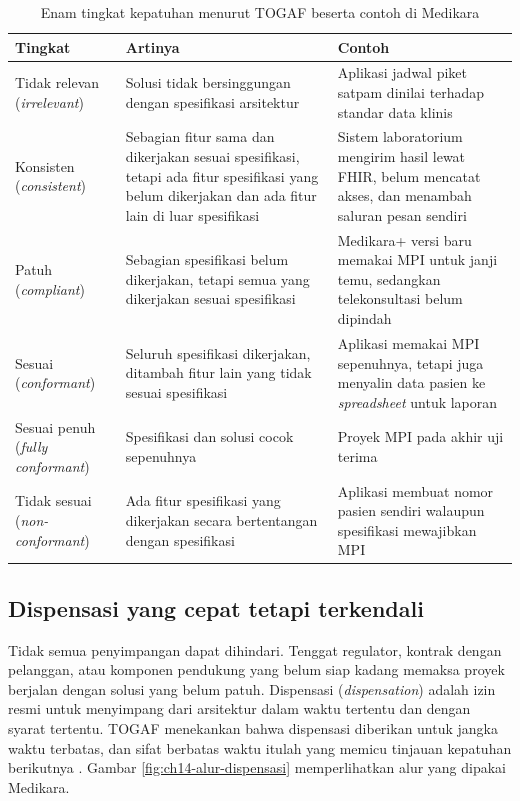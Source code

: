 \begin{table}[!htb]
  \centering
  \caption{Enam tingkat kepatuhan menurut TOGAF beserta contoh di Medikara}
  \label{tab:ch14-tingkat-kepatuhan}
  \begin{tabularx}{\textwidth}{>{\raggedright\arraybackslash}p{2.2cm}>{\raggedright\arraybackslash}X>{\raggedright\arraybackslash}X}
    \hline
    \textbf{Tingkat} & \textbf{Artinya} & \textbf{Contoh} \\
    \hline
    Tidak relevan (\textit{irrelevant}) & Solusi tidak bersinggungan dengan
      spesifikasi arsitektur & Aplikasi jadwal piket satpam dinilai
      terhadap standar data klinis \\
    \hline
    Konsisten (\textit{consistent}) & Sebagian fitur sama dan dikerjakan
      sesuai spesifikasi, tetapi ada fitur spesifikasi yang belum dikerjakan
      dan ada fitur lain di luar spesifikasi & Sistem laboratorium mengirim
      hasil lewat FHIR, belum mencatat akses, dan menambah saluran pesan
      sendiri \\
    \hline
    Patuh (\textit{compliant}) & Sebagian spesifikasi belum dikerjakan,
      tetapi semua yang dikerjakan sesuai spesifikasi & Medikara+ versi baru
      memakai MPI untuk janji temu, sedangkan telekonsultasi belum dipindah \\
    \hline
    Sesuai (\textit{conformant}) & Seluruh spesifikasi dikerjakan, ditambah
      fitur lain yang tidak sesuai spesifikasi & Aplikasi memakai MPI
      sepenuhnya, tetapi juga menyalin data pasien ke \textit{spreadsheet}
      untuk laporan \\
    \hline
    Sesuai penuh (\textit{fully conformant}) & Spesifikasi dan solusi cocok
      sepenuhnya & Proyek MPI pada akhir uji terima \\
    \hline
    Tidak sesuai (\textit{non-conformant}) & Ada fitur spesifikasi yang
      dikerjakan secara bertentangan dengan spesifikasi & Aplikasi membuat
      nomor pasien sendiri walaupun spesifikasi mewajibkan MPI \\
    \hline
  \end{tabularx}
\end{table}

\subsection*{Dispensasi yang cepat tetapi terkendali}

Tidak semua penyimpangan dapat dihindari. Tenggat regulator, kontrak dengan
pelanggan, atau komponen pendukung yang belum siap kadang memaksa proyek
berjalan dengan solusi yang belum patuh. Dispensasi (\textit{dispensation})
adalah izin resmi untuk menyimpang dari arsitektur dalam waktu tertentu dan
dengan syarat tertentu. TOGAF menekankan bahwa dispensasi diberikan untuk
jangka waktu terbatas, dan sifat berbatas waktu itulah yang memicu tinjauan
kepatuhan berikutnya \cite{togaf10}. Gambar \ref{fig:ch14-alur-dispensasi}
memperlihatkan alur yang dipakai Medikara.

